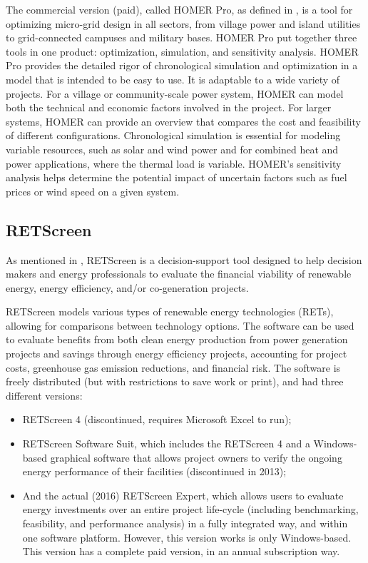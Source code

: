 \documentclass[journal]{IEEEtran}
\begin{document}
The commercial version (paid), called HOMER Pro, as defined in \cite{Swarnkar}, is a tool for optimizing micro-grid design in all sectors, from village power and island utilities to grid-connected campuses and military bases. HOMER Pro put together three tools in one product: optimization, simulation, and sensitivity analysis. HOMER Pro provides the detailed rigor of chronological simulation and optimization in a model that is intended to be easy to use. It is adaptable to a wide variety of projects. For a village or community-scale power system, HOMER can model both the technical and economic factors involved in the project. For larger systems, HOMER can provide an overview that compares the cost and feasibility of different configurations. Chronological simulation is essential for modeling variable resources, such as solar and wind power and for combined heat and power applications, where the thermal load is variable. HOMER's sensitivity analysis helps determine the potential impact of uncertain factors such as fuel prices or wind speed on a given system. 

\subsection{RETScreen}
As mentioned in \cite{Pradhan}, RETScreen is a decision-support tool designed to help decision makers and energy professionals to evaluate the financial viability of renewable energy, energy efficiency, and/or co-generation projects.

RETScreen models various types of renewable energy technologies (RETs), allowing for comparisons between technology options. The software can be used to evaluate benefits from both clean energy production from power generation projects and savings through energy efficiency projects, accounting for project costs, greenhouse gas emission reductions, and financial risk. The software is freely distributed (but with restrictions to save work or print), and had three different versions:

\begin{itemize}
\item RETScreen 4 (discontinued, requires Microsoft Excel to run); 
\item RETScreen Software Suit, which includes the RETScreen 4 and a Windows-based graphical software that allows project owners to verify the ongoing energy performance of their facilities (discontinued in 2013);
\item And the actual (2016) RETScreen Expert, which allows users to evaluate energy investments over an entire project life-cycle (including benchmarking, feasibility, and performance analysis) in a fully integrated way, and within one software platform. However, this version works is only Windows-based. This version has a complete paid version, in an annual subscription way.
\end{itemize}
\end{document}
